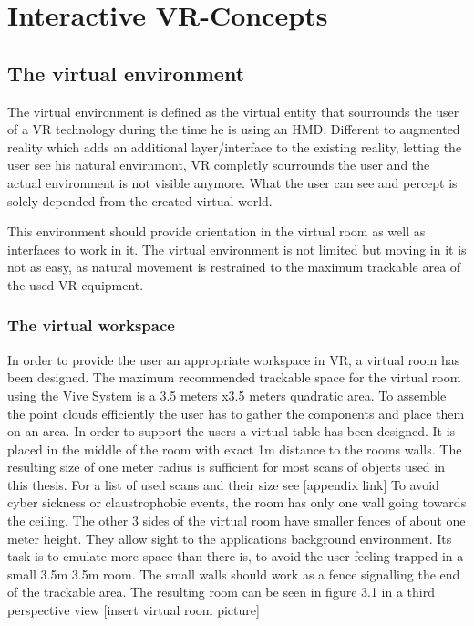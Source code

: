 \documentclass[hyperref,english,bachelorofscience,bibnum]{cgvpub}
\begin{document}
\chapter{Interactive VR-Concepts}

\section{The virtual environment}

The virtual environment is defined as the virtual entity that sourrounds the user of a VR technology during the time he is using an HMD. Different to augmented reality which adds an additional layer/interface to the existing reality, letting the user see his natural envirnmont, VR completly sourrounds the user and the actual environment is not visible anymore. What the user can see and percept is solely depended from the created virtual world\cite{Milgram1995}.

This environment should provide orientation in the virtual room as well as interfaces to work in it. The virtual environment is not limited but moving in it is not as easy, as natural movement is restrained to the maximum trackable area of the used VR equipment. 

\subsection{The virtual workspace}

In order to provide the user an appropriate workspace in VR, a virtual room has been designed. The maximum recommended trackable space for the virtual room using the Vive System is a 3.5 meters x3.5 meters quadratic area.\cite{vivehelp}
To assemble the point clouds efficiently the user has to gather the components and place them on an area. In order to support the users a virtual table has been designed. It is placed in the middle of the room with exact 1m distance to the rooms walls. The resulting size of one meter radius is sufficient for most scans of objects used in this thesis. For a list of used scans and their size see [appendix link]
To avoid cyber sickness or claustrophobic events, the room has only one wall going towards the ceiling. The other 3 sides of the virtual room have smaller fences of about one meter height. They allow sight to the applications background environment. Its task is to emulate more space than there is, to avoid the user feeling trapped in a small 3.5m 3.5m room. The small walls should work as a fence signalling the end of the trackable area. The resulting room can be seen in figure 3.1 in a third perspective view [insert virtual room picture]
 
\end{document}
